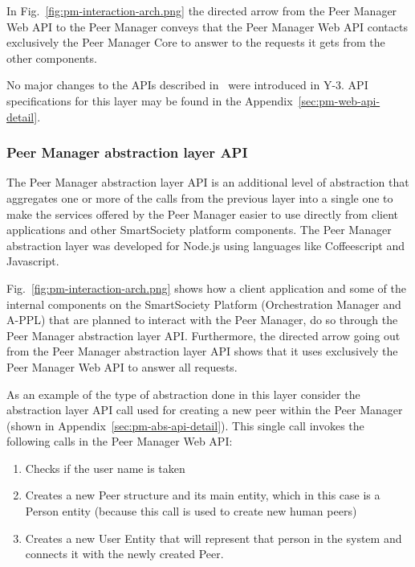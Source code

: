 In Fig.~\ref{fig:pm-interaction-arch.png} the directed arrow from the Peer Manager Web API to the Peer Manager conveys that the Peer Manager Web API contacts exclusively the Peer Manager Core to answer to the requests it gets from the other components.

No major changes to the APIs described in~\cite{D4.2} were introduced in Y-3. API specifications for this layer may be found in the Appendix~\ref{sec:pm-web-api-detail}.

\subsubsection{Peer Manager abstraction layer API} \label{ssec:pm-abs-api}
The Peer Manager abstraction layer API is an additional level of abstraction that aggregates one or more of the calls from the previous layer into a single one to make the services offered by the Peer Manager easier to use directly from client applications and other SmartSociety platform components. The Peer Manager abstraction layer was developed for Node.js using languages like Coffeescript and Javascript. 

Fig.~\ref{fig:pm-interaction-arch.png} shows how a client application and some of the internal components on the SmartSociety Platform (Orchestration Manager and A-PPL) that are planned to interact with the Peer Manager, do so through the Peer Manager abstraction layer API. Furthermore, the directed arrow going out from the Peer Manager abstraction layer API shows that it uses exclusively the Peer Manager Web API to answer all requests.

As an example of the type of abstraction done in this layer consider the abstraction layer API call used for creating a new peer within the Peer Manager (shown in Appendix~\ref{sec:pm-abs-api-detail}). This single call invokes the following calls in the Peer Manager Web API:
\begin{enumerate}
	\item Checks if the user name is taken
	\item Creates a new Peer structure and its main entity, which in this case is a Person entity (because this call is used to create new human peers)
	\item Creates a new User Entity that will represent that person in the system and connects it with the newly created Peer.
\end{enumerate}

